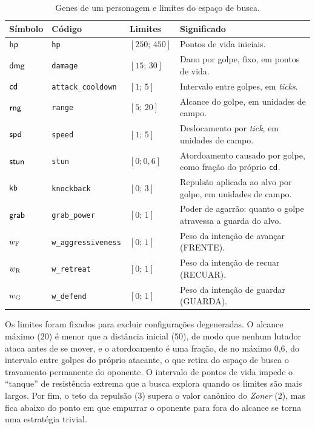 \begin{table}[htb]
    \caption{Genes de um personagem e limites do espaço de busca.}
    \label{tab: genes}
    \centering
    \small
    \begin{tabularx}{\textwidth}{l l l X}
        \toprule
        \textbf{Símbolo} & \textbf{Código} & \textbf{Limites} & \textbf{Significado} \\
        \midrule
        $\mathsf{hp}$   & \texttt{hp}               & $[250;\, 450]$ & Pontos de vida iniciais. \\
        $\mathsf{dmg}$  & \texttt{damage}           & $[15;\, 30]$   & Dano por golpe, fixo, em pontos de vida. \\
        $\mathsf{cd}$ & \texttt{attack\_cooldown} & $[1;\, 5]$     & Intervalo entre golpes, em \textit{ticks}. \\
        $\mathsf{rng}$  & \texttt{range}            & $[5;\, 20]$    & Alcance do golpe, em unidades de campo. \\
        $\mathsf{spd}$  & \texttt{speed}            & $[1;\, 5]$     & Deslocamento por \textit{tick}, em unidades de campo. \\
        $\mathsf{stun}$ & \texttt{stun}             & $[0; 0{,}6]$ & Atordoamento causado por golpe, como fração do próprio $\mathsf{cd}$. \\
        $\mathsf{kb}$   & \texttt{knockback}        & $[0;\, 3]$     & Repulsão aplicada ao alvo por golpe, em unidades de campo. \\
        $\mathsf{grab}$ & \texttt{grab\_power}      & $[0;\, 1]$     & Poder de agarrão: quanto o golpe atravessa a guarda do alvo. \\
        \midrule
        $w_{\mathrm{F}}$    & \texttt{w\_aggressiveness} & $[0;\, 1]$    & Peso da intenção de avançar (FRENTE). \\
        $w_{\mathrm{R}}$    & \texttt{w\_retreat}        & $[0;\, 1]$    & Peso da intenção de recuar (RECUAR). \\
        $w_{\mathrm{G}}$    & \texttt{w\_defend}         & $[0;\, 1]$    & Peso da intenção de guardar (GUARDA). \\
        \bottomrule
    \end{tabularx}
    \source
\end{table}

Os limites foram fixados para excluir configurações degeneradas. O alcance máximo (20) é menor que a distância inicial (50), de modo que nenhum lutador ataca antes de se mover, e o atordoamento é uma fração, de no máximo 0,6, do intervalo entre golpes do próprio atacante, o que retira do espaço de busca o travamento permanente do oponente. O intervalo de pontos de vida impede o ``tanque'' de resistência extrema que a busca explora quando os limites são mais largos. Por fim, o teto da repulsão (3) supera o valor canônico do \textit{Zoner} (2), mas fica abaixo do ponto em que empurrar o oponente para fora do alcance se torna uma estratégia trivial.

